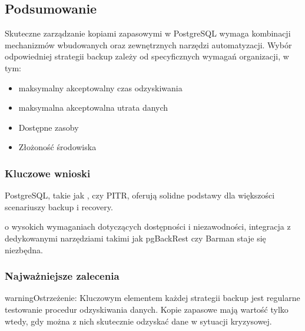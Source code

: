 \documentclass[letterpaper,10pt,polish]{sphinxmanual}
\begin{document}
\subsection{Podsumowanie}
\label{\detokenize{rozdzial2/Kopie_zapasowe_i_odzyskiwanie_danych/kopie_zapasowe_i_odzyskiwanie_danych:podsumowanie}}
\sphinxAtStartPar
Skuteczne zarządzanie kopiami zapasowymi w PostgreSQL wymaga kombinacji mechanizmów wbudowanych oraz zewnętrznych narzędzi automatyzacji. Wybór odpowiedniej strategii backup zależy od specyficznych wymagań organizacji, w tym:
\begin{itemize}
\item {} 
\sphinxAtStartPar
{} \sphinxhyphen{} maksymalny akceptowalny czas odzyskiwania

\item {} 
\sphinxAtStartPar
{} \sphinxhyphen{} maksymalna akceptowalna utrata danych

\item {} 
\sphinxAtStartPar
Dostępne zasoby

\item {} 
\sphinxAtStartPar
Złożoność środowiska

\end{itemize}


\subsubsection{Kluczowe wnioski}
\label{\detokenize{rozdzial2/Kopie_zapasowe_i_odzyskiwanie_danych/kopie_zapasowe_i_odzyskiwanie_danych:kluczowe-wnioski}}
\sphinxAtStartPar
{} PostgreSQL, takie jak ,  czy PITR, oferują solidne podstawy dla większości scenariuszy backup i recovery.

\sphinxAtStartPar
{} o wysokich wymaganiach dotyczących dostępności i niezawodności, integracja z dedykowanymi narzędziami takimi jak pgBackRest czy Barman staje się niezbędna.


\subsubsection{Najważniejsze zalecenia}
\label{\detokenize{rozdzial2/Kopie_zapasowe_i_odzyskiwanie_danych/kopie_zapasowe_i_odzyskiwanie_danych:najwazniejsze-zalecenia}}
\begin{sphinxadmonition}{warning}{Ostrzeżenie:}
\sphinxAtStartPar
Kluczowym elementem każdej strategii backup jest regularne testowanie procedur odzyskiwania danych. Kopie zapasowe mają wartość tylko wtedy, gdy można z nich skutecznie odzyskać dane w sytuacji kryzysowej.
\end{sphinxadmonition}
\end{document}
